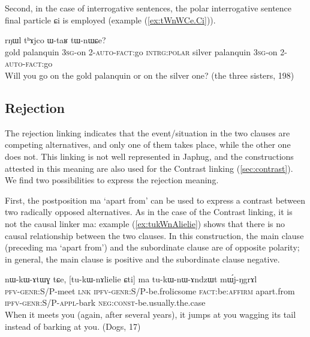 \documentclass[oldfontcommands,oneside,a4paper,11pt]{article}
\newcommand{\ipa}[1]{{\phon \mbox{#1}}} %
\newcommand{\refb}[1]{(\ref{#1})}
\begin{document}
Second, in the case of interrogative sentences, the polar interrogative sentence final particle \ipa{ɕi} is employed (example \refb{ex:tWnWCe.Ci}).

\begin{exe}
\ex \label{ex:tWnWCe.Ci}
\gll 
[\ipa{χsɤr}    	\ipa{tʰɤjco}    	\ipa{ɯ-taʁ}    	\ipa{tɯ-nɯ-ɕe}]    	\ipa{ɕi,}    	\ipa{rŋɯl}    	\ipa{tʰɤjco}    	\ipa{ɯ-taʁ}    	\ipa{tɯ-nɯɕe?}    	\\
gold palanquin \textsc{3sg}-on \textsc{2-auto-fact}:go \textsc{intrg:polar} silver palanquin \textsc{3sg}-on \textsc{2-auto-fact}:go \\
\glt Will you go on the gold palanquin or on the silver one? (the three sisters, 198)
 \end{exe}
 
\subsection{Rejection} \label{sec:rejection}

The rejection linking indicates that the event/situation in the two clauses are competing alternatives, and only one of them takes place, while the other one  does not. This linking is not well represented in Japhug, and the constructions attested in this meaning are also used for the Contrast linking \refb{sec:contrast}. We find two possibilities to express the rejection meaning.

First, the postposition \ipa{ma} `apart from'  can be used to express a contrast between two radically opposed alternatives.  As in the case of the Contrast linking, it is not the causal linker \ipa{ma}: example \refb{ex:tukWnAlielie} shows that there is no causal relationship between the two clauses. In this construction, the main clause (preceding  \ipa{ma} `apart from') and the subordinate clause are of opposite polarity; in general, the main clause is positive and the subordinate clause negative.



\begin{exe}
\ex \label{ex:tukWnAlielie}
\gll
\ipa{nɯ-kɯ-ɤtɯɣ}  	\ipa{tɕe,}  	[\ipa{tu-kɯ-nɤlielie}  	\ipa{ɕti}]  	\ipa{ma}  	\ipa{tu-kɯ-nɯ-ɤndzɯt}  	\ipa{mɯ́j-ŋgrɤl}  	\\
\textsc{pfv-genr:S/P}-meet \textsc{lnk} \textsc{ipfv-genr:S/P}-be.frolicsome \textsc{fact}:be:\textsc{affirm}  apart.from \textsc{ipfv-genr:S/P}-\textsc{appl}-bark \textsc{neg:const}-be.usually.the.case \\
\glt When it meets you (again, after several years), it jumps at you wagging its tail instead of barking at you.  (Dogs, 17)
\end{exe}
 
\end{document}
